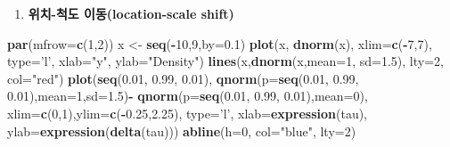 \documentclass[b5paper,]{scrbook}
\makeatletter
\newenvironment{Shaded}{\begin{snugshade}}{\end{snugshade}}
\newcommand{\DataTypeTok}[1]{\textcolor[rgb]{0.13,0.29,0.53}{#1}}
\newcommand{\DecValTok}[1]{\textcolor[rgb]{0.00,0.00,0.81}{#1}}
\newcommand{\FloatTok}[1]{\textcolor[rgb]{0.00,0.00,0.81}{#1}}
\newcommand{\KeywordTok}[1]{\textcolor[rgb]{0.13,0.29,0.53}{\textbf{#1}}}
\newcommand{\NormalTok}[1]{#1}
\newcommand{\OperatorTok}[1]{\textcolor[rgb]{0.81,0.36,0.00}{\textbf{#1}}}
\newcommand{\StringTok}[1]{\textcolor[rgb]{0.31,0.60,0.02}{#1}}
\providecommand{\tightlist}{%
  \setlength{\itemsep}{0pt}\setlength{\parskip}{0pt}}
\theoremstyle{plain}
\theoremstyle{definition}
\numberwithin{equation}{section}
\newenvironment{kframe}{%
\medskip{}
\setlength{\fboxsep}{.8em}
 \def\at@end@of@kframe{}%
 \ifinner\ifhmode%
  \def\at@end@of@kframe{\end{minipage}}%
  \begin{minipage}{\columnwidth}%
 \fi\fi%
 \def\FrameCommand##1{\hskip\@totalleftmargin \hskip-\fboxsep
 \colorbox{shadecolor}{##1}\hskip-\fboxsep
     \hskip-\linewidth \hskip-\@totalleftmargin \hskip\columnwidth}%
 \MakeFramed {\advance\hsize-\width
   \@totalleftmargin\z@ \linewidth\hsize
   \@setminipage}}%
 {\par\unskip\endMakeFramed%
 \at@end@of@kframe}
\renewenvironment{Shaded}{\begin{kframe}}{\end{kframe}}
\makeatother
\begin{document}
\begin{enumerate}
\def\labelenumi{\arabic{enumi}.}
\setcounter{enumi}{2}
\tightlist
\item
  \textbf{위치-척도 이동(location-scale shift)}
\end{enumerate}

\begin{Shaded}
\begin{Highlighting}[]
\KeywordTok{par}\NormalTok{(}\DataTypeTok{mfrow=}\KeywordTok{c}\NormalTok{(}\DecValTok{1}\NormalTok{,}\DecValTok{2}\NormalTok{))}
\NormalTok{x <-}\StringTok{ }\KeywordTok{seq}\NormalTok{(}\OperatorTok{-}\DecValTok{10}\NormalTok{,}\DecValTok{9}\NormalTok{,}\DataTypeTok{by=}\FloatTok{0.1}\NormalTok{)}
\KeywordTok{plot}\NormalTok{(x, }\KeywordTok{dnorm}\NormalTok{(x), }\DataTypeTok{xlim=}\KeywordTok{c}\NormalTok{(}\OperatorTok{-}\DecValTok{7}\NormalTok{,}\DecValTok{7}\NormalTok{), }\DataTypeTok{type=}\StringTok{'l'}\NormalTok{, }\DataTypeTok{xlab=}\StringTok{"y"}\NormalTok{, }\DataTypeTok{ylab=}\StringTok{"Density"}\NormalTok{)}
\KeywordTok{lines}\NormalTok{(x,}\KeywordTok{dnorm}\NormalTok{(x,}\DataTypeTok{mean=}\DecValTok{1}\NormalTok{, }\DataTypeTok{sd=}\FloatTok{1.5}\NormalTok{), }\DataTypeTok{lty=}\DecValTok{2}\NormalTok{, }\DataTypeTok{col=}\StringTok{"red"}\NormalTok{)}
\KeywordTok{plot}\NormalTok{(}\KeywordTok{seq}\NormalTok{(}\FloatTok{0.01}\NormalTok{, }\FloatTok{0.99}\NormalTok{, }\FloatTok{0.01}\NormalTok{), }\KeywordTok{qnorm}\NormalTok{(}\DataTypeTok{p=}\KeywordTok{seq}\NormalTok{(}\FloatTok{0.01}\NormalTok{, }\FloatTok{0.99}\NormalTok{, }\FloatTok{0.01}\NormalTok{),}\DataTypeTok{mean=}\DecValTok{1}\NormalTok{,}\DataTypeTok{sd=}\FloatTok{1.5}\NormalTok{)}\OperatorTok{-}\StringTok{ }\KeywordTok{qnorm}\NormalTok{(}\DataTypeTok{p=}\KeywordTok{seq}\NormalTok{(}\FloatTok{0.01}\NormalTok{, }\FloatTok{0.99}\NormalTok{, }\FloatTok{0.01}\NormalTok{),}\DataTypeTok{mean=}\DecValTok{0}\NormalTok{), }\DataTypeTok{xlim=}\KeywordTok{c}\NormalTok{(}\DecValTok{0}\NormalTok{,}\DecValTok{1}\NormalTok{),}\DataTypeTok{ylim=}\KeywordTok{c}\NormalTok{(}\OperatorTok{-}\FloatTok{0.25}\NormalTok{,}\FloatTok{2.25}\NormalTok{), }\DataTypeTok{type=}\StringTok{'l'}\NormalTok{, }\DataTypeTok{xlab=}\KeywordTok{expression}\NormalTok{(tau), }\DataTypeTok{ylab=}\KeywordTok{expression}\NormalTok{(}\KeywordTok{delta}\NormalTok{(tau)))}
\KeywordTok{abline}\NormalTok{(}\DataTypeTok{h=}\DecValTok{0}\NormalTok{, }\DataTypeTok{col=}\StringTok{"blue"}\NormalTok{, }\DataTypeTok{lty=}\DecValTok{2}\NormalTok{)}
\end{Highlighting}
\end{Shaded}
\end{document}
